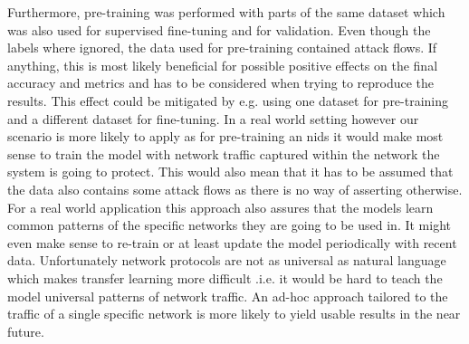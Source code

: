 Furthermore, pre-training was performed with parts of the same dataset which was also used for supervised fine-tuning and for validation. Even though the labels where ignored, the data used for pre-training contained attack flows. If anything, this is most likely beneficial for possible positive effects on the final accuracy and metrics and has to be considered when trying to reproduce the results. This effect could be mitigated by e.g. using one dataset for pre-training and a different dataset for fine-tuning. In a real world setting however our scenario is more likely to apply as for pre-training an \gls{nids} it would make most sense to train the model with network traffic captured within the network the system is going to protect. This would also mean that it has to be assumed that the data also contains some attack flows as there is no way of asserting otherwise. For a real world application this approach also assures that the models learn common patterns of the specific networks they are going to be used in. It might even make sense to re-train or at least update the model periodically with recent data. Unfortunately network protocols are not as universal as natural language which makes transfer learning more difficult .i.e. it would be hard to teach the model universal patterns of network traffic. An ad-hoc approach tailored to the traffic of a single specific network is more likely to yield usable results in the near future. \par

